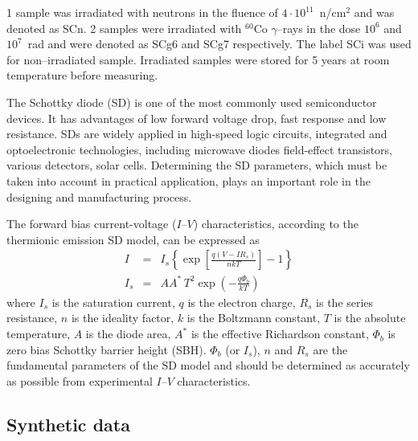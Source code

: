 \documentclass[aip,jap,reprint]{revtex4-1}
\begin{document}
1 sample  was  irradiated  with  neutrons  in  the fluence  of $4\cdot10^{11}$~n/cm$^2$  and was denoted as SCn. 
2 samples were irradiated  with  $^{60}$Co $\gamma$--rays in the  dose  $10^6$ and $10^7$~rad and were denoted as SCg6 and SCg7 respectively.
The label SCi was used for non--irradiated sample.
Irradiated samples were stored  for  5 years  at  room  temperature before measuring.





The Schottky diode (SD) is one of the most commonly used semiconductor devices.
It has advantages of low forward voltage drop, fast response and low resistance.
SDs are widely applied in high-speed logic circuits, integrated and optoelectronic technologies, including microwave diodes field-effect transistors, various detectors, solar cells.
Determining the SD parameters, which must be taken into account in practical application, plays an important role in the designing and manufacturing process.

The forward bias current-voltage ($I$--$V$) characteristics, according to the thermionic emission SD model, can be expressed as\cite{Rhoderick1988}
\begin{eqnarray}
\label{eqSD}
I&=&I_s\left\{\exp\left[\frac{q(V-IR_s)}{nkT}\right]-1\right\}\\
\label{eqIs}
I_s&=&AA^*\,T^2\exp\left(-\frac{q\Phi_b}{kT}\right)
\end{eqnarray}
where
$I_s$ is the saturation current,
$q$ is the electron charge,
$R_s$ is the series resistance,
$n$ is the ideality factor,
$k$ is the Boltzmann constant,
$T$ is the absolute temperature,
$A$ is the diode area,
$A^*$ is the effective Richardson constant,
$\Phi_b$ is zero bias Schottky barrier height (SBH).
$\Phi_b$ (or $I_s$), $n$ and $R_s$ are the fundamental parameters of the SD model and should be determined as accurately as possible from experimental $I$--$V$ characteristics.



\subsection{Synthetic data\label{SubData}}
\end{document}
